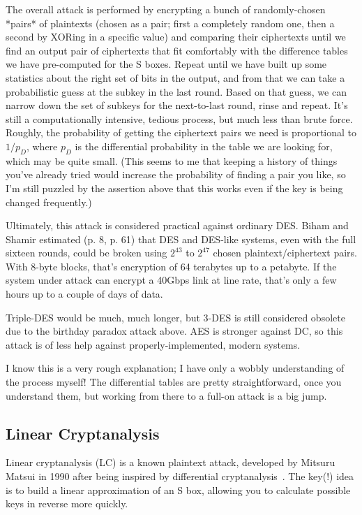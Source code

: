 The overall attack is performed by encrypting a bunch of
randomly-chosen *pairs* of plaintexts (chosen as a pair; first a
completely random one, then a second by XORing in a specific value)
and comparing their ciphertexts until we find an output pair of
ciphertexts that fit comfortably with the difference tables we have
pre-computed for the S boxes.  Repeat until we have built up some
statistics about the right set of bits in the output, and from that we
can take a probabilistic guess at the subkey in the last round.  Based
on that guess, we can narrow down the set of subkeys for the
next-to-last round, rinse and repeat.  It's still a computationally
intensive, tedious process, but much less than brute force.  Roughly,
the probability of getting the ciphertext pairs we need is
proportional to $1/p_D$, where $p_D$ is the differential probability in
the table we are looking for, which may be quite small.
(This seems to me that keeping a history of things you've already
tried would increase the probability of finding a pair you like, so
I'm still puzzled by the assertion above that this works even if the
key is being changed frequently.)

Ultimately, this attack is considered practical against ordinary DES.
Biham and Shamir estimated (p. 8, p. 61) that DES and DES-like
systems, even with the full sixteen rounds, could be broken using
$2^{43}$ to $2^{47}$ chosen plaintext/ciphertext pairs.  With 8-byte
blocks, that's encryption of 64 terabytes up to a petabyte.  If the
system under attack can encrypt a 40Gbps link at line rate, that's
only a few hours up to a couple of days of data.

Triple-DES would be much, much longer, but 3-DES is still considered
obsolete due to the birthday paradox attack above.  AES is stronger
against DC, so this attack is of less help against
properly-implemented, modern systems.

I know this is a very rough explanation; I have only a wobbly
understanding of the process myself!  The differential tables are
pretty straightforward, once you understand them, but working from
there to a full-on attack is a big jump.

\subsection{Linear Cryptanalysis}

Linear cryptanalysis (LC) is a known plaintext attack, developed by
Mitsuru Matsui in 1990 after being inspired by differential
cryptanalysis~\cite{matsui1993linear}.  The key(!)  idea is to build a
linear approximation of an S box, allowing you to calculate possible
keys in reverse more quickly.

